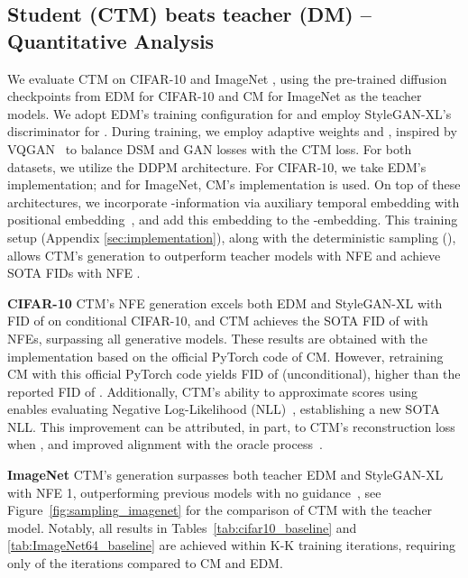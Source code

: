 \documentclass{article} \usepackage{iclr2024_coNFErence,times}
\theoremstyle{definition}
\theoremstyle{remark}
\begin{document}
\subsection{Student (CTM) beats teacher (DM) -- Quantitative Analysis}

We evaluate CTM on CIFAR-10 and ImageNet , using the pre-trained diffusion checkpoints from EDM for CIFAR-10 and CM for ImageNet as the teacher models. We adopt EDM's training configuration for  and employ StyleGAN-XL's~\citep{sauer2022stylegan} discriminator for . During training, we employ adaptive weights  and , inspired by VQGAN~\citep{esser2021taming} to balance DSM and GAN losses with the CTM loss. For both datasets, we utilize the DDPM architecture. For CIFAR-10, we take EDM's implementation; and for ImageNet, CM's implementation is used.
On top of these architectures, we incorporate -information via auxiliary temporal embedding with positional embedding~\citep{vaswani2017attention}, and add this embedding to the -embedding. This training setup (Appendix \ref{sec:implementation}), along with the deterministic sampling (), allows CTM's generation to outperform teacher models with NFE  and achieve SOTA FIDs with NFE . 

\textbf{CIFAR-10 } CTM's NFE  generation excels both EDM and StyleGAN-XL with FID of  on conditional CIFAR-10, and CTM achieves the SOTA FID of  with  NFEs, surpassing all generative models. These results are obtained with the implementation based on the official PyTorch code of CM. However, retraining CM with this official PyTorch code yields FID of  (unconditional), higher than the reported FID of . Additionally, CTM's ability to approximate scores using  enables evaluating Negative Log-Likelihood (NLL)~\citep{song2021maximum,kim2022maximum}, establishing a new SOTA NLL. This improvement can be attributed, in part, to CTM's reconstruction loss when , and improved alignment with the oracle process~\citep{lai2023fp}.

\textbf{ImageNet } CTM's generation surpasses both teacher EDM and StyleGAN-XL with NFE 1, outperforming previous models with no guidance~\citep{dhariwal2021diffusion}, see Figure~\ref{fig:sampling_imagenet} for the comparison of CTM with the teacher model. Notably, all results in Tables~\ref{tab:cifar10_baseline} and \ref{tab:ImageNet64_baseline} are achieved within K-K training iterations, requiring only  of the iterations compared to CM and EDM. 
\end{document}
